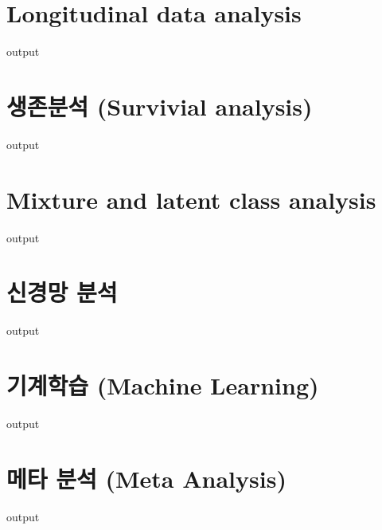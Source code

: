 \documentclass{report}
\begin{document}
\section{Longitudinal data analysis}
\begin{Schunk}
\begin{Soutput}
output
\end{Soutput}
\end{Schunk}

\section{생존분석 (Survivial analysis)}
\begin{Schunk}
\begin{Soutput}
output
\end{Soutput}
\end{Schunk}

\section{Mixture and latent class analysis}
\begin{Schunk}
\begin{Soutput}
output
\end{Soutput}
\end{Schunk}

\section{신경망 분석}
\begin{Schunk}
\begin{Soutput}
output
\end{Soutput}
\end{Schunk}

\section{기계학습 (Machine Learning)}
\begin{Schunk}
\begin{Soutput}
output
\end{Soutput}
\end{Schunk}

\section{메타 분석 (Meta Analysis)}
\begin{Schunk}
\begin{Soutput}
output
\end{Soutput}
\end{Schunk}
\end{document}
